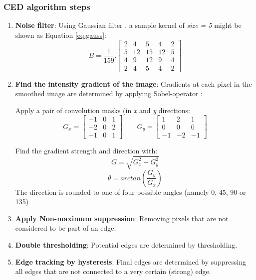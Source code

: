 \subsubsection{CED algorithm steps}
\label{sec:ced_step}
\begin{enumerate}
	\item \textbf{Noise filter}: Using Gaussian filter \nocite{gauss_filter}, a sample kernel of \textit{size = 5} might be shown as Equation \ref{eq:gauss}:
	\begin{equation}
		\label{eq:gauss}
		B = \frac{1}{159} .
		\left[ \begin{array}{ccccc}
		2 & 4 & 5 & 4 & 2 \\
		5 & 12 & 15 & 12 & 5 \\
		4 & 9 & 12 & 9 & 4 \\
		2 & 4 & 5 & 4 & 2
		\end{array} \right]
	\end{equation}

	\item \textbf{Find the intensity gradient of the image}: Gradients at each pixel in the smoothed image are determined by applying Sobel-operator \cite{sobel_alg}:

	Apply a pair of convolution masks (in \textit{x} and \textit{y} directions:
	\begin{equation}
		\label{eq:gx_gy}
		G_x =
		\left[ \begin{array}{ccc}
		-1 & 0 & 1 \\
		-2 & 0 & 2 \\
		-1 & 0 & 1
		\end{array} \right]
		\qquad
		G_y =
		\left[ \begin{array}{ccc}
		1 & 2 & 1 \\
		0 & 0 & 0 \\
		-1 & -2 & -1
		\end{array} \right]
	\end{equation}

	Find the gradient strength and direction with:
	\begin{equation}
		\label{eq:gradient}
		G = \sqrt{G^2_x + G^2_y}
	\end{equation}
	\begin{equation}
		\label{eq:direction}
		\theta = arctan(\frac{G_y}{G_x})
	\end{equation}
	The direction is rounded to one of four possible angles (namely 0, 45, 90 or 135)

	\item \textbf{Apply Non-maximum suppression}: Removing pixels that are not considered to be part of an edge.
	\item \textbf{Double thresholding}: Potential edges are determined by thresholding.
	\item \textbf{Edge tracking by hysteresis}: Final edges are determined by suppressing all edges that are not connected to a very certain (strong) edge.
\end{enumerate}

